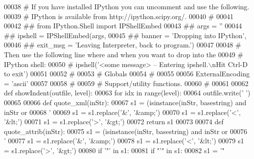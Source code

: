 \begin{DoxyCode}
{{{{00038 \textcolor{comment}{# If you have installed IPython you can uncomment and use the following.}
00039 \textcolor{comment}{# IPython is available from http://ipython.scipy.org/.}
00040 \textcolor{comment}{#}
00041 
00042 \textcolor{comment}{## from IPython.Shell import IPShellEmbed}
00043 \textcolor{comment}{## args = ''}
00044 \textcolor{comment}{## ipshell = IPShellEmbed(args,}
00045 \textcolor{comment}{##     banner = 'Dropping into IPython',}
00046 \textcolor{comment}{##     exit\_msg = 'Leaving Interpreter, back to program.')}
00047 
00048 \textcolor{comment}{# Then use the following line where and when you want to drop into the}
00049 \textcolor{comment}{# IPython shell:}
00050 \textcolor{comment}{#    ipshell('<some message> -- Entering ipshell.\(\backslash\)nHit Ctrl-D to exit')}
00051 
00052 \textcolor{comment}{#}
00053 \textcolor{comment}{# Globals}
00054 \textcolor{comment}{#}
00055 
00056 ExternalEncoding = \textcolor{stringliteral}{'ascii'}
00057 
00058 \textcolor{comment}{#}
00059 \textcolor{comment}{# Support/utility functions.}
00060 \textcolor{comment}{#}
00061 
00062 \textcolor{keyword}{def }showIndent(outfile, level):
00063     \textcolor{keywordflow}{for} idx \textcolor{keywordflow}{in} range(level):
00064         outfile.write(\textcolor{stringliteral}{'    '})
00065 
00066 \textcolor{keyword}{def }quote_xml(inStr):
00067     s1 = (isinstance(inStr, basestring) \textcolor{keywordflow}{and} inStr \textcolor{keywordflow}{or}
00068           \textcolor{stringliteral}{'%
00069     s1 = s1.replace(\textcolor{stringliteral}{'&'}, \textcolor{stringliteral}{'&amp;'})
00070     s1 = s1.replace(\textcolor{stringliteral}{'<'}, \textcolor{stringliteral}{'&lt;'})
00071     s1 = s1.replace(\textcolor{stringliteral}{'>'}, \textcolor{stringliteral}{'&gt;'})
00072     \textcolor{keywordflow}{return} s1
00073 
00074 \textcolor{keyword}{def }quote_attrib(inStr):
00075     s1 = (isinstance(inStr, basestring) \textcolor{keywordflow}{and} inStr \textcolor{keywordflow}{or}
00076           \textcolor{stringliteral}{'%
00077     s1 = s1.replace(\textcolor{stringliteral}{'&'}, \textcolor{stringliteral}{'&amp;'})
00078     s1 = s1.replace(\textcolor{stringliteral}{'<'}, \textcolor{stringliteral}{'&lt;'})
00079     s1 = s1.replace(\textcolor{stringliteral}{'>'}, \textcolor{stringliteral}{'&gt;'})
00080     \textcolor{keywordflow}{if} \textcolor{stringliteral}{'"'} \textcolor{keywordflow}{in} s1:
00081         \textcolor{keywordflow}{if} \textcolor{stringliteral}{"'"} \textcolor{keywordflow}{in} s1:
00082             s1 = \textcolor{stringliteral}{'"%
}}}}}}}
\end{DoxyCode}
